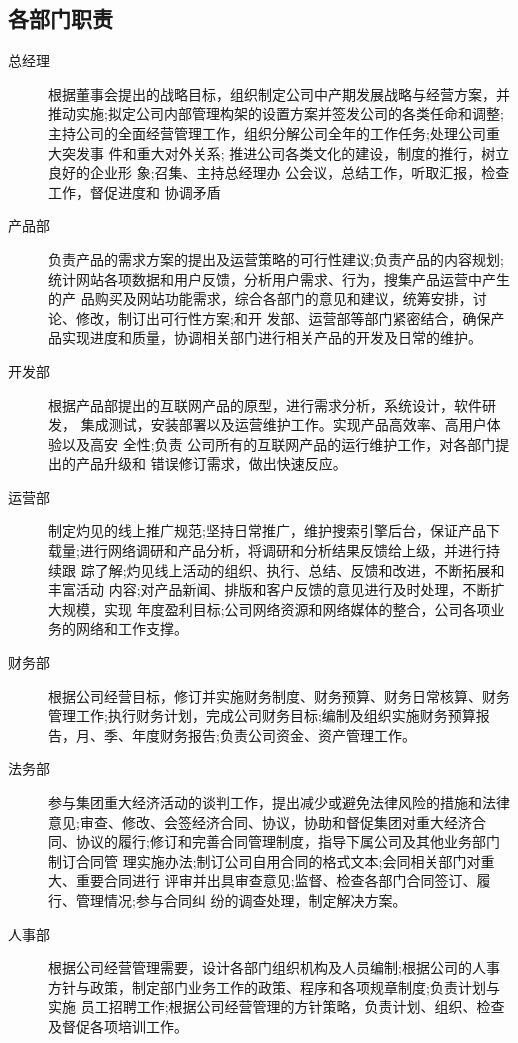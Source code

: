 \documentclass[UTF8]{ctexart}
\begin{document}
\subsection{各部门职责}
\begin{description}
	\item[总经理]根据董事会提出的战略目标，组织制定公司中产期发展战略与经营方案，并 推动实施;拟定公司内部管理构架的设置方案并签发公司的各类任命和调整;主持公司的全面经营管理工作，组织分解公司全年的工作任务;处理公司重大突发事 件和重大对外关系; 推进公司各类文化的建设，制度的推行，树立良好的企业形 象;召集、主持总经理办 公会议，总结工作，听取汇报，检查工作，督促进度和 协调矛盾
	\item[产品部]负责产品的需求方案的提出及运营策略的可行性建议;负责产品的内容规划; 统计网站各项数据和用户反馈，分析用户需求、行为，搜集产品运营中产生的产 品购买及网站功能需求，综合各部门的意见和建议，统筹安排，讨论、修改，制订出可行性方案;和开 发部、运营部等部门紧密结合，确保产品实现进度和质量，协调相关部门进行相关产品的开发及日常的维护。
	\item[开发部]根据产品部提出的互联网产品的原型，进行需求分析，系统设计，软件研发， 集成测试，安装部署以及运营维护工作。实现产品高效率、高用户体验以及高安 全性;负责 公司所有的互联网产品的运行维护工作，对各部门提出的产品升级和 错误修订需求，做出快速反应。
	\item[运营部]制定灼见的线上推广规范;坚持日常推广，维护搜索引擎后台，保证产品下 载量;进行网络调研和产品分析，将调研和分析结果反馈给上级，并进行持续跟 踪了解;灼见线上活动的组织、执行、总结、反馈和改进，不断拓展和丰富活动 内容;对产品新闻、排版和客户反馈的意见进行及时处理，不断扩大规模，实现 年度盈利目标;公司网络资源和网络媒体的整合，公司各项业务的网络和工作支撑。
	\item[财务部]根据公司经营目标，修订并实施财务制度、财务预算、财务日常核算、财务管理工作;执行财务计划，完成公司财务目标;编制及组织实施财务预算报告，月、季、年度财务报告;负责公司资金、资产管理工作。
	\item[法务部]参与集团重大经济活动的谈判工作，提出减少或避免法律风险的措施和法律 意见;审查、修改、会签经济合同、协议，协助和督促集团对重大经济合同、协议的履行;修订和完善合同管理制度，指导下属公司及其他业务部门制订合同管 理实施办法;制订公司自用合同的格式文本;会同相关部门对重大、重要合同进行 评审并出具审查意见;监督、检查各部门合同签订、履行、管理情况;参与合同纠 纷的调查处理，制定解决方案。
	\item[人事部]根据公司经营管理需要，设计各部门组织机构及人员编制;根据公司的人事方针与政策，制定部门业务工作的政策、程序和各项规章制度;负责计划与实施 员工招聘工作;根据公司经营管理的方针策略，负责计划、组织、检查及督促各项培训工作。
\end{description}
\end{document}
